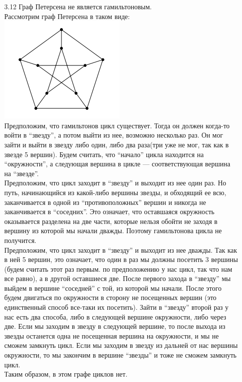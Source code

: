 \documentclass[10pt]{article}
\begin{document}
\begin{enumerate}
\item[3.12] Граф Петерсена не является гамильтоновым.\\
Рассмотрим граф Петерсена в таком виде:
\includegraphics{petersen.png}\\
Предположим, что гамильтонов цикл существует. Тогда он должен когда-то войти в ``звезду'', а потом выйти из нее, возможно несколько раз. Он мог зайти и выйти в звезду либо один, либо два раза(три уже не мог, так как в звезде 5 вершин). Будем считать, что ``начало'' цикла находится на ``окружности'', а следующая вершина в цикле --- соответствующая вершина на ``звезде''.\\
Предположим, что цикл заходит в ``звезду'' и выходит из нее один раз. Но путь, начинающийся из какой-либо вершины звезды, и обходящий ее всю, заканчивается в одной из ``противоположных'' вершин и никогда не заканчивается в ``соседних''. Это означает, что оставшаяся окружность оказывается разделена на две части, которые нельзя обойти не заходя в вершину из которой мы начали дважды. Поэтому гамильтонова цикла не получится.\\
Предположим, что цикл заходит в ``звезду'' и выходит из нее дважды. Так как в ней 5 вершин, это означает, что один в раз мы должны посетить 3 вершины (будем считать этот раз первым. по предположению у нас цикл, так что нам все равно), а в другой оставшиеся две. После первого захода в ``звезду'' мы выйдем в вершине ``соседней'' с той, из которой мы начали. После этого будем двигаться по окружности в сторону не посещенных вершин (это единственный способ все-таки их посетить). Зайти в ``звезду'' второй раз у нас есть два способа, либо в следующей вершине окружности, либо через две. Если мы заходим в звезду в следующей вершине, то после выхода из звезды останется одна не посещенная вершина на окружности, и мы не сможем замкнуть цикл. Если мы заходим в звезду из дальней от нас вершины окружности, то мы закончим в вершине ``звезды'' и тоже не сможем замкнуть цикл.\\
Таким образом, в этом графе циклов нет.\\


\end{enumerate}
\end{document}
